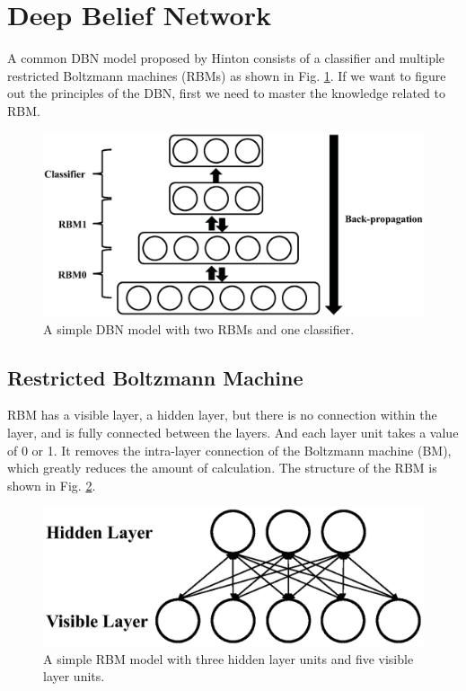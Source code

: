 \documentclass{modified}
\begin{document}
\section{Deep Belief Network}
A common DBN model \cite{hinton2006fast} proposed by Hinton consists of a classifier and multiple restricted Boltzmann machines (RBMs) as shown in Fig. \ref{fig:dbn}. If we want to figure out the principles of the DBN, first we need to master the knowledge related to RBM.

\begin{figure}[htbp]
	\centering
	\includegraphics[width=\columnwidth]{dbn.eps}
	\caption{A simple DBN model with two RBMs and one classifier.}
	\label{fig:dbn}
\end{figure}

\subsection{Restricted Boltzmann Machine}
RBM \cite{hinton1986learning} has a visible layer, a hidden layer, but there is no connection within the layer, and is fully connected between the layers. And each layer unit takes a value of 0 or 1. It removes the intra-layer connection of the Boltzmann machine (BM), which greatly reduces the amount of calculation. The structure of the RBM is shown in Fig. \ref{fig:rbm}.
		
\begin{figure}[htbp]
	\centering
	\includegraphics[width=\columnwidth]{rbm.eps}
	\caption{A simple RBM model with three hidden layer units and five visible layer units.}
	\label{fig:rbm}
\end{figure}
	
\end{document}
